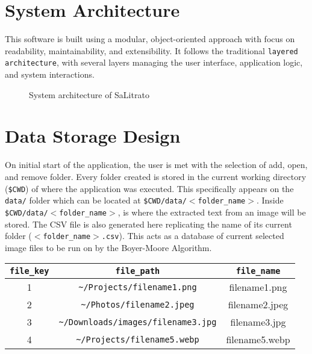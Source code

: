 \section*{System Architecture}

\hspace\parindent
This software is built using a modular, object-oriented approach with focus on readability,
maintainability, and extensibility. It follows the traditional \texttt{layered architecture}, with
several layers managing the user interface, application logic, and system interactions.

\begin{figure}[hbt!]
    \center
    \noindent{}
    \caption{System architecture of SaLitrato}
    \label{fig:plannedUI}
\end{figure}

\section*{Data Storage Design}

\hspace\parindent
On initial start of the application, the user is met with the selection of add, open, and remove
folder. Every folder created is stored in the current working directory (\texttt{\$CWD}) of where 
the application was executed. This specifically appears on the \texttt{data/} folder which
can be located at \texttt{\$CWD/data/$<$folder\_name$>$}.
Inside \texttt{\$CWD/data/$<$folder\_name$>$}, is where the extracted text from an image will be
stored. The CSV file is also generated here replicating the name of its current folder 
(\texttt{$<$folder\_name$>$.csv}). This acts as a database of current selected image files to 
be run on by the Boyer-Moore Algorithm.

\begin{center}
\begin{tabular}{| c | c | c |}
    \hline
    \texttt{file\_key} & \texttt{file\_path} & \texttt{file\_name}\\
    \hline
    1 & \texttt{\textasciitilde/Projects/filename1.png} & filename1.png\\
    \hline
    2 & \texttt{\textasciitilde/Photos/filename2.jpeg} & filename2.jpeg\\
    \hline
    3 & \texttt{\textasciitilde/Downloads/images/filename3.jpg} & filename3.jpg\\
    \hline
    4 & \texttt{\textasciitilde/Projects/filename5.webp} & filename5.webp\\
    \hline
\end{tabular}
\end{center}

